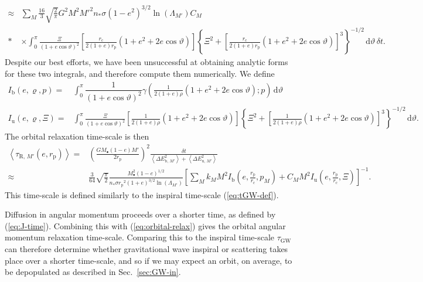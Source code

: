 \documentclass[useAMS,usedcolumn,usegraphicx,usenatbib]{mn2e}
\newcommand{\eqnref}[1]{(\ref{eq:#1})}
\newcommand{\secref}[1]{Sec.~\ref{sec:#1}}
\newcommand{\sub}[1]{\ensuremath{_\mathrm{#1}}}
\newcommand{\dd}{\ensuremath{\mathrm{d}}}
\newcommand{\intd}[4]{\ensuremath{\displaystyle \int_{#1}^{#2}{#3}\,\dd{#4}}}
\newcommand{\recip}[1]{\ensuremath{\dfrac{1}{#1}}}
\begin{document}
\begin{onecolumn}
\begin{align}
 \approx {} & \sum_M \frac{16}{3}\sqrt{\frac{2}{\pi}}G^2 M^2{M'}^2n_\ast\sigma\left(1-e^2\right)^{3/2}\ln\left(\Lambda_{M'}\right)C_M \nonumber \\*
 & \times {} \intd{0}{\pi}{\frac{\Xi}{(1 + e \cos\vartheta)^2}\left[\frac{r\sub{c}}{2(1+e)r\sub{p}}\left(1+e^2+2e\cos\vartheta\right)\right]\left\{\Xi^2 + \left[\frac{r\sub{c}}{2(1+e)r\sub{p}}\left(1+e^2+2e\cos\vartheta\right)\right]^3\right\}^{-1/2}}{\vartheta}\,\delta t.
\end{align}
Despite our best efforts, we have been unsuccessful at obtaining analytic forms for these two integrals, and therefore compute them numerically. We define
\begin{align}
I\sub{b}(e,\varrho,p) = {} & \intd{0}{\pi}{\recip{(1 + e \cos\vartheta)^2}\gamma\left(\frac{1}{2(1+e)\rho}\left(1+e^2+2e\cos\vartheta\right);p\right)}{\vartheta} \\
I\sub{u}(e,\varrho,\Xi) = {} & \intd{0}{\pi}{\frac{\Xi}{(1 + e \cos\vartheta)^2}\left[\frac{1}{2(1+e)\rho}\left(1+e^2+2e\cos\vartheta\right)\right]\left\{\Xi^2 + \left[\frac{1}{2(1+e)\rho}\left(1+e^2+2e\cos\vartheta\right)\right]^3\right\}^{-1/2}}{\vartheta}.
\end{align}
The orbital relaxation time-scale is then
\begin{align}
\left\langle\tau_{\mathrm{R},\,M'}\left(e,r\sub{p}\right)\right\rangle = {} & \left(\frac{GM_\bullet(1 - e)M'}{2r\sub{p}}\right)^2\frac{\delta t}{\left\langle\Delta E^2_{\mathrm{b},\,M'}\right\rangle + \left\langle\Delta E^2_{\mathrm{u},\,M'}\right\rangle} \\
 \approx {} & \frac{3}{64}\sqrt{\frac{\pi}{2}} \frac{M_\bullet^2(1 - e)^{1/2}}{n_\ast \sigma r\sub{p}^2(1 + e)^{3/2}\ln\left(\Lambda_{M'}\right)} \left[\sum_M k_M M^2 I\sub{b}\left(e,\frac{r\sub{p}}{r\sub{c}},p_M\right) + C_M M^2 I\sub{u}\left(e,\frac{r\sub{p}}{r\sub{c}},\Xi\right)\right]^{-1}.
\label{eq:orbital-relax}
\end{align}
This time-scale is defined similarly to the inspiral time-scale \eqnref{tGW-def}.

Diffusion in angular momentum proceeds over a shorter time, as defined by \eqnref{J-time}. Combining this with \eqnref{orbital-relax} gives the orbital angular momentum relaxation time-scale. Comparing this to the inspiral time-scale $\tau\sub{GW}$ can therefore determine whether gravitational wave inspiral or scattering takes place over a shorter time-scale, and so if we may expect an orbit, on average, to be depopulated as described in \secref{GW-in}.


\end{onecolumn}
\end{document}
